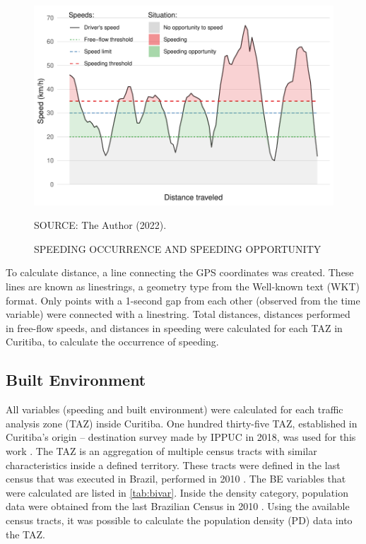 
\begin{figure}[!htbp]
    \centering\footnotesize
    \captionsetup{font=footnotesize}
    \caption{SPEEDING OCCURRENCE AND SPEEDING OPPORTUNITY}
    \includegraphics{fig/spd_occur.pdf}
    \label{fig:spd_occur}
    \par SOURCE: The Author (2022).
\end{figure}


To calculate distance, a line connecting the GPS coordinates was created. These lines are known as linestrings, a geometry type from the Well-known text (WKT) format. Only points with a 1-second gap from each other (observed from the time variable) were connected with a linestring. Total distances, distances performed in free-flow speeds, and distances in speeding were calculated for each TAZ in Curitiba, to calculate the occurrence of speeding. 

\subsection{Built Environment} \label{sub:be}




All variables (speeding and built environment) were calculated for each traffic analysis zone (TAZ) inside Curitiba. One hundred thirty-five TAZ, established in Curitiba's origin – destination survey made by IPPUC in 2018, was used for this work \cite{IPPUC2018b}. The TAZ is an aggregation of multiple census tracts with similar characteristics inside a defined territory. These tracts were defined in the last census that was executed in Brazil, performed in 2010 \cite{IBGE2010}. The BE variables that were calculated are listed in \autoref{tab:bivar}. Inside the density category, population data were obtained from the last Brazilian Census in 2010 \cite{IBGE2010}. Using the available census tracts, it was possible to calculate the population density (PD) data into the TAZ. 

